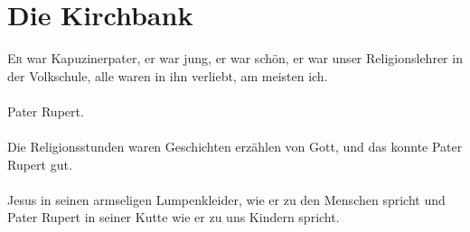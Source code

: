 \chapter{Die Kirchbank}
\lettrine{E}{r} war Kapuzinerpater, er war jung, er war schön, er war unser Religionslehrer in der Volkschule, alle waren in ihn verliebt, am meisten ich. \\\\
Pater Rupert.\\\\
Die Religionsstunden waren Geschichten erzählen von Gott, und das konnte Pater Rupert gut. \\\\
Jesus in seinen armseligen Lumpenkleider, wie er zu den Menschen spricht und Pater Rupert in seiner Kutte wie er zu uns Kindern spricht. \\\\
